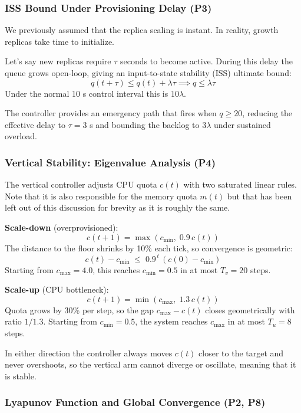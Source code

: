 \documentclass[twocolumn]{article}
\begin{document}
\subsubsection{ISS Bound Under Provisioning Delay (P3)}
\label{sec:orgb45feb9}

We previously assumed that the replica scaling is instant. In reality, growth replicas take time to initialize.

Let's say new replicas require \(\tau\) seconds to become active. During this delay the queue grows open-loop, giving an input-to-state stability (ISS) ultimate bound:
$$q(t + \tau) \leq q(t) + \lambda\tau \implies q \leq \lambda\tau$$
Under the normal 10 s control interval this is \(10\lambda\).

The controller provides an emergency path that fires when \(q \geq 20\), reducing the effective delay to \(\tau = 3\) s and bounding the backlog to \(3\lambda\) under sustained overload.
\subsubsection{Vertical Stability: Eigenvalue Analysis (P4)}
\label{sec:orgb4dc1e6}

The vertical controller adjusts CPU quota \(c(t)\) with two saturated linear rules. Note that it is also responsible for the memory quota \(m(t)\) but that has been left out of this discussion for brevity as it is roughly the same.

\textbf{Scale-down} (overprovisioned):
$$c(t+1) = \max(c_{\min},\; 0.9\,c(t))$$
The distance to the floor shrinks by 10\% each tick, so convergence is geometric:
$$c(t) - c_{\min} \;\leq\; 0.9^{\,t}\,(c(0) - c_{\min})$$
Starting from \(c_{\max} = 4.0\), this reaches \(c_{\min} = 0.5\) in at most
\(T_v = 20\) steps.

\textbf{Scale-up} (CPU bottleneck):
$$c(t+1) = \min(c_{\max},\; 1.3\,c(t))$$
Quota grows by 30\% per step, so the gap \(c_{\max} - c(t)\) closes geometrically with ratio \(1/1.3\). Starting from \(c_{\min} = 0.5\), the system reaches \(c_{\max}\) in at most \(T_u = 8\) steps.

In either direction the controller always moves \(c(t)\) closer to the target and never overshoots, so the vertical arm cannot diverge or oscillate, meaning that it is stable.
\subsubsection{Lyapunov Function and Global Convergence (P2, P8)}
\label{sec:org20e824a}
\end{document}

